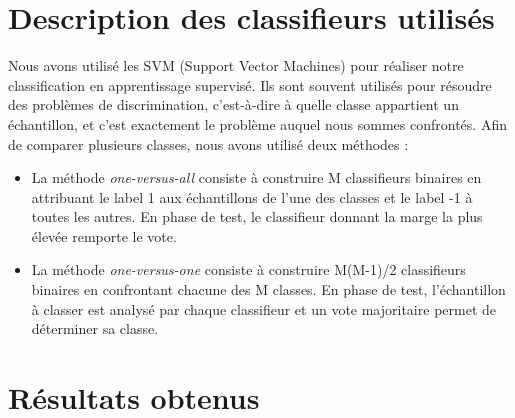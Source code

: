 \section{Description des classifieurs utilisés}

Nous avons utilisé les SVM (Support Vector Machines) pour réaliser notre classification en apprentissage supervisé. Ils sont souvent utilisés pour résoudre des problèmes de discrimination, c'est-à-dire à quelle classe appartient un échantillon, et c'est exactement le problème auquel nous sommes confrontés. Afin de comparer plusieurs classes, nous avons utilisé deux méthodes :\\

\begin{itemize}
\item La méthode \emph{one-versus-all} consiste à construire M classifieurs binaires en attribuant le label 1 aux échantillons de l'une des classes et le label -1 à toutes les autres. En phase de test, le classifieur donnant la marge la plus élevée remporte le vote.
\item La méthode \emph{one-versus-one} consiste à construire M(M-1)/2 classifieurs binaires en confrontant chacune des M classes. En phase de test, l'échantillon à classer est analysé par chaque classifieur et un vote majoritaire permet de déterminer sa classe.\\
\end{itemize}


\section{Résultats obtenus}